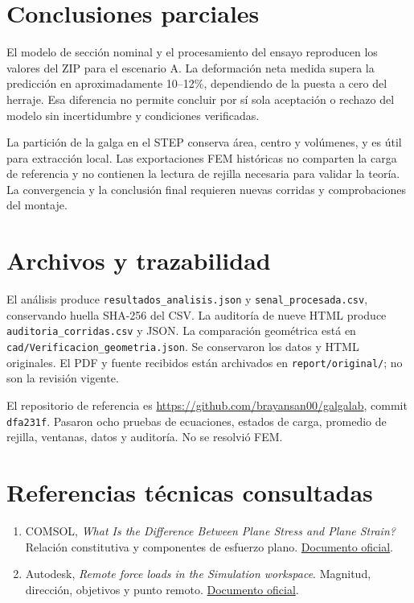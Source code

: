 \documentclass[11pt,a4paper]{article}
\begin{document}
\section{Conclusiones parciales}
El modelo de sección nominal y el procesamiento del ensayo reproducen los valores del ZIP para el escenario A. La deformación neta medida supera la predicción en aproximadamente 10--12\%, dependiendo de la puesta a cero del herraje. Esa diferencia no permite concluir por sí sola aceptación o rechazo del modelo sin incertidumbre y condiciones verificadas.

La partición de la galga en el STEP conserva área, centro y volúmenes, y es útil para extracción local. Las exportaciones FEM históricas no comparten la carga de referencia y no contienen la lectura de rejilla necesaria para validar la teoría. La convergencia y la conclusión final requieren nuevas corridas y comprobaciones del montaje.

\appendix
\section{Archivos y trazabilidad}
El análisis produce \texttt{resultados\_analisis.json} y \texttt{senal\_procesada.csv}, conservando huella SHA-256 del CSV. La auditoría de nueve HTML produce \texttt{auditoria\_corridas.csv} y JSON. La comparación geométrica está en \texttt{cad/Verificacion\_geometria.json}. Se conservaron los datos y HTML originales. El PDF y fuente recibidos están archivados en \texttt{report/original/}; no son la revisión vigente.

El repositorio de referencia es \url{https://github.com/brayansan00/galgalab}, commit \texttt{dfa231f}. Pasaron ocho pruebas de ecuaciones, estados de carga, promedio de rejilla, ventanas, datos y auditoría. No se resolvió FEM.

\section{Referencias técnicas consultadas}
\begin{enumerate}
\item COMSOL, \emph{What Is the Difference Between Plane Stress and Plane Strain?} Relación constitutiva y componentes de esfuerzo plano. \href{https://www.comsol.com/blogs/what-is-the-difference-between-plane-stress-and-plane-strain/}{Documento oficial}.
\item Autodesk, \emph{Remote force loads in the Simulation workspace}. Magnitud, dirección, objetivos y punto remoto. \href{https://help.autodesk.com/cloudhelp/ENU/Fusion-Simulate/files/SIM-REMOTE-FORCE-CONCEPT.htm}{Documento oficial}.
\end{enumerate}
\end{document}
